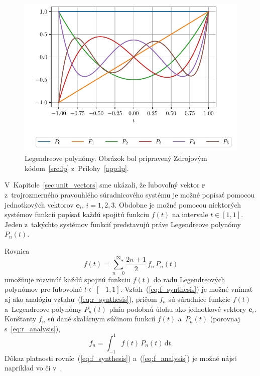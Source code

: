 \documentclass[a4paper,12pt]{book}
\newcommand{\diff}{\mathrm d}
\let\vec\mathbf
\begin{document}
\begin{figure}[bt]
\centering
\includegraphics{./fig-legendre-polynomials.pdf}
\caption{Legendreove polynómy.  Obrázok bol pripravený Zdrojovým
kódom~\ref{src:lp} z~Prílohy~\ref{app:lp}.}
\label{fig:lp}
\end{figure}

V~Kapitole~\ref{sec:unit_vectors} sme ukázali, že ľubovoľný vektor $\vec r$
z~trojrozmerného pravouhlého súradnicového systému je možné popísať pomocou
jednotkových vektorov $\vec e_i$, $i = 1, 2, 3$.  Obdobne je možné pomocou
niektorých systémov funkcií popísať každú spojitú funkciu $f(t)$ na intervale
$t \in [1, 1]$.  Jeden z~takýchto systémov funkcií predstavujú práve
Legendreove polynómy~$P_n(t)$.

Rovnica
%
\begin{equation}
\label{eq:f_synthesis}
f(t) = \sum_{n = 0}^\infty \frac{2n + 1}{2} \, f_n \, P_n(t)
\end{equation}
%
umožňuje rozvinúť každú spojitú funkciu $f(t)$ do radu Legendreových polynómov
pre ľubovoľné $t \in [-1, 1]$.  Vzťah~(\ref{eq:f_synthesis}) je možné vnímať aj
ako analógiu vzťahu~(\ref{eq:r_synthesis}), pričom $f_n$ sú súradnice funkcie
$f(t)$ a~Legendreove polynómy $P_n(t)$ plnia podobnú úlohu ako jednotkové
vektory $\vec e_i$.  Konštanty $f_n$ sú dané skalárnym súčinom funkcií $f(t)$
a~$P_n(t)$ (porovnaj s~\ref{eq:r_analysis}),
%
\begin{equation}
\label{eq:f_analysis}
f_n = \int_{-1}^1 f(t) \, P_n(t) \, \diff t{.}
\end{equation}
%
Dôkaz platnosti rovníc~(\ref{eq:f_synthesis}) a~(\ref{eq:f_analysis}) je možné 
nájsť napríklad vo \textcite{Freeden2009} či 
v~\textcite{SansoGeoidDetermination}.
\end{document}
